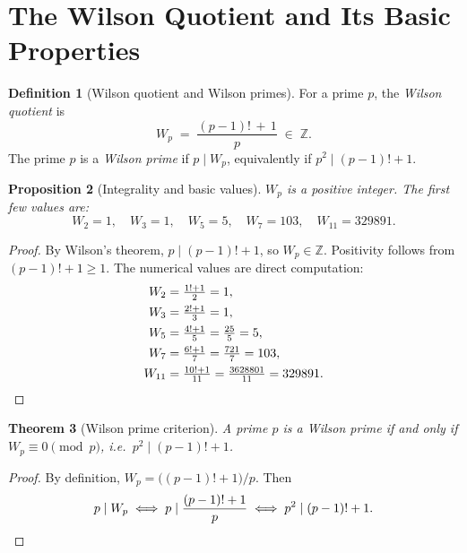 \documentclass[12pt,a4paper]{amsart}
\newtheorem{theorem}{Theorem}[section]
\newtheorem{proposition}[theorem]{Proposition}
\theoremstyle{definition}
\newtheorem{definition}[theorem]{Definition}
\newcommand{\Z}{\mathbb{Z}}
\begin{document}
\section{The Wilson Quotient and Its Basic Properties}

\begin{definition}[Wilson quotient and Wilson primes]\label{def:wilson_quotient}
  For a prime $p$, the \emph{Wilson quotient} is
  \[
    W_p \;=\; \frac{(p-1)!\,+\,1}{p} \;\in\; \Z.
  \]
  The prime $p$ is a \emph{Wilson prime} if $p \mid W_p$,
  equivalently if $p^2 \mid (p-1)! + 1$.
\end{definition}

\begin{proposition}[Integrality and basic values]\label{prop:basic}
  $W_p$ is a positive integer.  The first few values are:
  \[
    W_2 = 1,\quad W_3 = 1,\quad W_5 = 5,\quad W_7 = 103,\quad W_{11} = 329891.
  \]
\end{proposition}

\begin{proof}
  By Wilson's theorem, $p \mid (p-1)! + 1$, so $W_p \in \Z$.
  Positivity follows from $(p-1)! + 1 \geq 1$.
  The numerical values are direct computation:
  \begin{align*}
    W_2 &= \tfrac{1!+1}{2} = 1,\\
    W_3 &= \tfrac{2!+1}{3} = 1,\\
    W_5 &= \tfrac{4!+1}{5} = \tfrac{25}{5} = 5,\\
    W_7 &= \tfrac{6!+1}{7} = \tfrac{721}{7} = 103,\\
    W_{11} &= \tfrac{10!+1}{11} = \tfrac{3628801}{11} = 329891.\qedhere
  \end{align*}
\end{proof}

\begin{theorem}[Wilson prime criterion]\label{thm:wilson_prime_criterion}
  A prime $p$ is a Wilson prime if and only if $W_p \equiv 0 \pmod p$,
  i.e.\ $p^2 \mid (p-1)! + 1$.
\end{theorem}

\begin{proof}
  By definition, $W_p = \bigl((p-1)!+1\bigr)/p$.  Then
  \[
    p \mid W_p
    \iff p \mid \frac{(p-1)!+1}{p}
    \iff p^2 \mid (p-1)! + 1. \qedhere
  \]
\end{proof}

\end{document}
